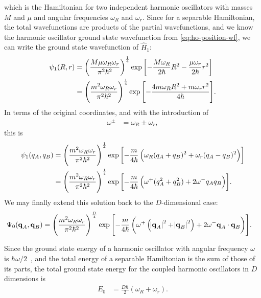 which is the Hamiltonian for two independent harmonic oscillators with masses $M$ and $\mu$ and angular frequencies $\omega_R$ and $\omega_r$.
Since for a separable Hamiltonian, the total wavefunctions are products of the partial wavefunctions, and we know the harmonic oscillator ground state wavefunction from \vref{eq:ho-position-wf}, we can write the ground state wavefunction of $\hat{H}_1$:
\begin{subequations}
\begin{align}
	\psi_1(R, r)
	&= \left( \frac{M \mu \omega_R \omega_r}{\pi^2 \hbar^2} \right)^\frac{1}{4}
		\exp{\left[ -\frac{M \omega_R}{2 \hbar} R^2 - \frac{\mu \omega_r}{2 \hbar} r^2 \right]} \\
	&= \left( \frac{m^2 \omega_R \omega_r}{\pi^2 \hbar^2} \right)^\frac{1}{4}
		\exp{\left[ -\frac{4 m \omega_R R^2 + m \omega_r r^2}{4 \hbar} \right]}.
\end{align}
\end{subequations}
In terms of the original coordinates, and with the introduction of
\begin{align}
	\omega^\pm
	&= \omega_R \pm \omega_r,
\end{align}
this is
\begin{subequations} \label{eq:oscillators-wf-1d}
\begin{align}
	\psi_1(q_A, q_B)
	&= \left( \frac{m^2 \omega_R \omega_r}{\pi^2 \hbar^2} \right)^\frac{1}{4}
		\exp{\left[ -\frac{m}{4 \hbar} \left( \omega_R (q_A + q_B)^2 + \omega_r (q_A - q_B)^2 \right) \right]} \\
	&= \left( \frac{m^2 \omega_R \omega_r}{\pi^2 \hbar^2} \right)^\frac{1}{4}
		\exp{\left[ -\frac{m}{4 \hbar} \left( \omega^+ (q_A^2 + q_B^2) + 2 \omega^- q_A q_B \right) \right]}.
\end{align}
\end{subequations}
We may finally extend this solution back to the $D$-dimensional case:
\begin{align}
	\Psi_0(\bm{\mathbf{q}}_A, \bm{\mathbf{q}}_B)
	&= \left( \frac{m^2 \omega_R \omega_r}{\pi^2 \hbar^2} \right)^\frac{D}{4}
		\exp{\left[ -\frac{m}{4 \hbar} \left(
			\omega^+ \left( \abs{\bm{\mathbf{q}}_A}^2 + \abs{\bm{\mathbf{q}}_B}^2 \right)
			+ 2 \omega^- \bm{\mathbf{q}}_A \cdot \bm{\mathbf{q}}_B
		\right) \right]}.
\end{align}

Since the ground state energy of a harmonic oscillator with angular frequency $\omega$ is $\hbar \omega / 2$~\cite[438]{messiah1999quantum}, and the total energy of a separable Hamiltonian is the sum of those of its parts, the total ground state energy for the coupled harmonic oscillators in $D$ dimensions is
\begin{align}
	E_0
	&= \frac{D \hbar}{2} (\omega_R + \omega_r).
		\label{eq:oscillators-energy-exact}
\end{align}


